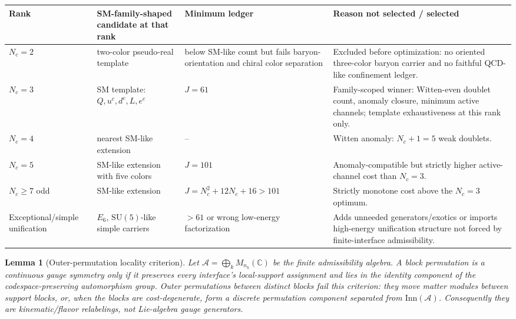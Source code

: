\documentclass[11pt]{article}
\newtheorem{lemma}[theorem]{Lemma}
\theoremstyle{definition}
\newcommand{\SU}{\mathrm{SU}}
\begin{document}
\begin{center}
\scriptsize
\renewcommand{\arraystretch}{1.1}
\begin{tabular}{@{}p{2.6cm}p{3.0cm}p{3.0cm}p{4.2cm}@{}}
\toprule
\textbf{Rank} & \textbf{SM-family-shaped candidate at that rank} & \textbf{Minimum ledger} & \textbf{Reason not selected / selected} \\
\midrule
$N_c=2$ & two-color pseudo-real template & below SM-like count but fails baryon-orientation and chiral color separation & Excluded before optimization: no oriented three-color baryon carrier and no faithful QCD-like confinement ledger. \\
$N_c=3$ & SM template: $Q,u^c,d^c,L,e^c$ & $J=61$ & Family-scoped winner: Witten-even doublet count, anomaly closure, minimum active channels; template exhaustiveness at this rank only. \\
$N_c=4$ & nearest SM-like extension & -- & Witten anomaly: $N_c+1=5$ weak doublets. \\
$N_c=5$ & SM-like extension with five colors & $J=101$ & Anomaly-compatible but strictly higher active-channel cost than $N_c=3$. \\
$N_c\ge7$ odd & SM-like extension & $J=N_c^2+12N_c+16>101$ & Strictly monotone cost above the $N_c=3$ optimum. \\
Exceptional/simple unification & $E_6$, $\SU(5)$-like simple carriers & $>61$ or wrong low-energy factorization & Adds unneeded generators/exotics or imports high-energy unification structure not forced by finite-interface admissibility. \\
\bottomrule
\end{tabular}
\label{tab:joint_Nc_template_optimum}
\end{center}

\begin{lemma}[Outer-permutation locality criterion]
\label{lem:outer_kinematic}
Let $\mathcal A=\bigoplus_k M_{n_k}(\mathbb C)$ be the finite admissibility
algebra.  A block permutation is a continuous gauge symmetry only if it
preserves every interface's local-support assignment and lies in the identity
component of the codespace-preserving automorphism group.  Outer permutations
between distinct blocks fail this criterion: they move matter modules between
support blocks, or, when the blocks are cost-degenerate, form a discrete
permutation component separated from $\mathrm{Inn}(\mathcal A)$.
Consequently they are kinematic/flavor relabelings, not Lie-algebra gauge
generators.
\end{lemma}
\end{document}
